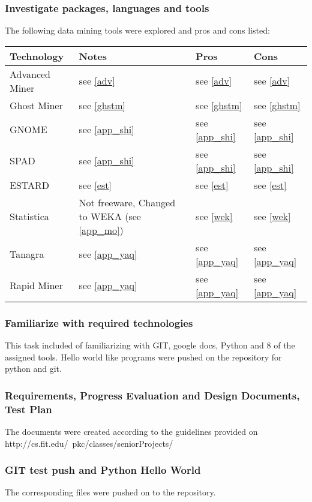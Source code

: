 \documentclass[12pt]{article}
\begin{document}
	\subsubsection{Investigate packages, languages and tools}
	The following data mining tools were explored and pros and cons listed: \\ 
	
	\begin{tabularx}{\textwidth}{|X|X|X|X|}
	\hline
	\textbf{Technology} & \textbf{Notes} & \textbf{Pros} & \textbf{Cons} \\ \hline
	Advanced Miner & see \ref{adv}&see \ref{adv}& see \ref{adv}\\ \hline
	Ghost Miner & see \ref{ghstm} &  see \ref{ghstm}& see \ref{ghstm} \\ \hline
	GNOME & see \ref{app_shi} & see \ref{app_shi} & see \ref{app_shi}  \\ \hline
	SPAD & see \ref{app_shi} & see \ref{app_shi} & see \ref{app_shi}  \\ \hline
	ESTARD & see \ref{est} & see \ref{est} & see \ref{est}\\ \hline
	Statistica & Not freeware, Changed to WEKA (see \ref{app_mo}) & see \ref{wek} & see \ref{wek} \\ \hline
	Tanagra & see \ref{app_yaq} & see \ref{app_yaq} & see \ref{app_yaq} \\ \hline
	Rapid Miner & see \ref{app_yaq} & see \ref{app_yaq} & see \ref{app_yaq} \\ \hline
	\end{tabularx}

	\subsubsection{Familiarize with required technologies}
	This task included of familiarizing with GIT, google docs, Python and 8 of the assigned tools. Hello world like programs were pushed on the repository for python and git.
	\subsubsection{Requirements, Progress Evaluation and Design Documents, Test Plan}
	The documents were created according to the guidelines provided on http://cs.fit.edu/~pkc/classes/seniorProjects/
	\subsubsection{GIT test push and Python Hello World}
	The corresponding files were pushed on to the repository.
\end{document}
